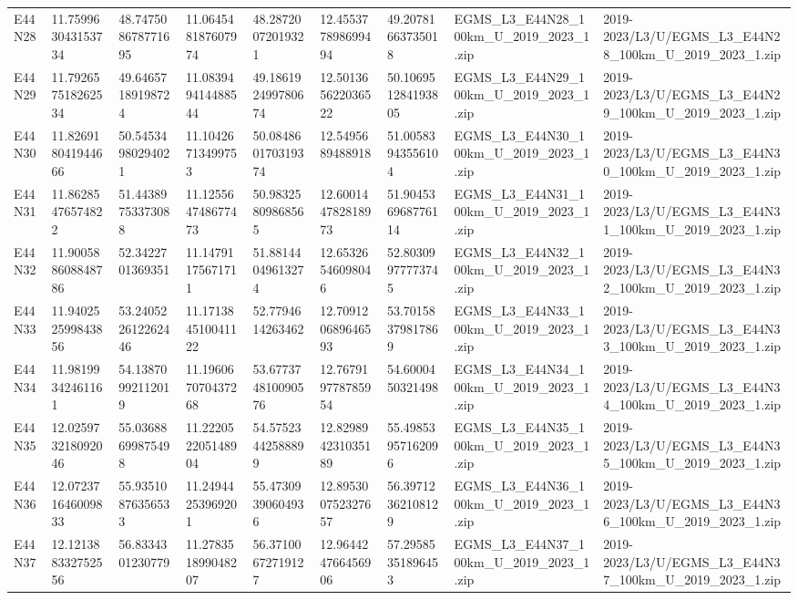 \begin{landscape}
\begin{longtable}{lllllllll}
E44N28 & 11.759963043153734 & 48.747508678771695 & 11.064548187607974 & 48.28720072019321 & 12.455377898699494 & 49.20781663735018 & EGMS\_L3\_E44N28\_100km\_U\_2019\_2023\_1.zip & 2019-2023/L3/U/EGMS\_L3\_E44N28\_100km\_U\_2019\_2023\_1.zip \\
E44N29 & 11.792657518262534 & 49.64657189198724 & 11.083949414488544 & 49.186192499780674 & 12.501365622036522 & 50.106951284193805 & EGMS\_L3\_E44N29\_100km\_U\_2019\_2023\_1.zip & 2019-2023/L3/U/EGMS\_L3\_E44N29\_100km\_U\_2019\_2023\_1.zip \\
E44N30 & 11.826918041944666 & 50.54534980294021 & 11.10426713499753 & 50.084860170319374 & 12.5495689488918 & 51.00583943556104 & EGMS\_L3\_E44N30\_100km\_U\_2019\_2023\_1.zip & 2019-2023/L3/U/EGMS\_L3\_E44N30\_100km\_U\_2019\_2023\_1.zip \\
E44N31 & 11.86285476574822 & 51.44389753373088 & 11.125564748677473 & 50.98325809868565 & 12.600144782818973 & 51.904536968776114 & EGMS\_L3\_E44N31\_100km\_U\_2019\_2023\_1.zip & 2019-2023/L3/U/EGMS\_L3\_E44N31\_100km\_U\_2019\_2023\_1.zip \\
E44N32 & 11.900588608848786 & 52.3422701369351 & 11.14791175671711 & 51.88144049613274 & 12.65326546098046 & 52.80309977773745 & EGMS\_L3\_E44N32\_100km\_U\_2019\_2023\_1.zip & 2019-2023/L3/U/EGMS\_L3\_E44N32\_100km\_U\_2019\_2023\_1.zip \\
E44N33 & 11.940252599843856 & 53.240522612262446 & 11.171384510041122 & 52.7794614263462 & 12.709120689646593 & 53.70158379817869 & EGMS\_L3\_E44N33\_100km\_U\_2019\_2023\_1.zip & 2019-2023/L3/U/EGMS\_L3\_E44N33\_100km\_U\_2019\_2023\_1.zip \\
E44N34 & 11.98199342461161 & 54.13870992112019 & 11.196067070437268 & 53.677374810090576 & 12.767919778785954 & 54.6000450321498 & EGMS\_L3\_E44N34\_100km\_U\_2019\_2023\_1.zip & 2019-2023/L3/U/EGMS\_L3\_E44N34\_100km\_U\_2019\_2023\_1.zip \\
E44N35 & 12.025973218092046 & 55.03688699875498 & 11.222052205148904 & 54.57523442588899 & 12.829894231035189 & 55.49853957162096 & EGMS\_L3\_E44N35\_100km\_U\_2019\_2023\_1.zip & 2019-2023/L3/U/EGMS\_L3\_E44N35\_100km\_U\_2019\_2023\_1.zip \\
E44N36 & 12.072371646009833 & 55.93510876356533 & 11.24944253969201 & 55.47309390604936 & 12.895300752327657 & 56.39712362108129 & EGMS\_L3\_E44N36\_100km\_U\_2019\_2023\_1.zip & 2019-2023/L3/U/EGMS\_L3\_E44N36\_100km\_U\_2019\_2023\_1.zip \\
E44N37 & 12.121388332752556 & 56.8334301230779 & 11.278351899048207 & 56.37100672719127 & 12.964424766456906 & 57.29585351896453 & EGMS\_L3\_E44N37\_100km\_U\_2019\_2023\_1.zip & 2019-2023/L3/U/EGMS\_L3\_E44N37\_100km\_U\_2019\_2023\_1.zip \\

\end{longtable}
\end{landscape}
